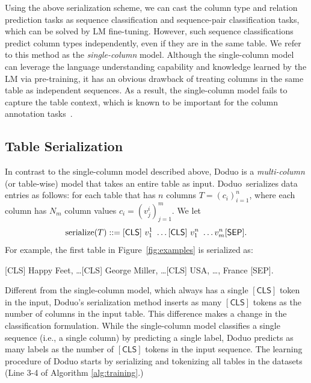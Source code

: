 \documentclass[sigconf]{acmart}
\newcommand{\name}{\mbox{\sc Doduo}}
\newcommand{\rev}[1]{#1}
\begin{document}
\vspace{-1em}
Using the above serialization scheme, we can cast the column type and relation prediction tasks as sequence classification
and sequence-pair classification tasks, which can be solved by LM fine-tuning. However, such sequence classifications predict column types independently, even if they are in the same table. 
We refer to this method as the \emph{single-column} model.
Although the single-column model can leverage the language understanding capability and knowledge learned by the LM via pre-training, 
it has an obvious drawback of treating columns in the same table as independent sequences.
As a result, the single-column model fails to capture the table context, which is known to be important for the column annotation tasks~\cite{Chen:2019:IJCAI:HNN,Zhang:2020:Sato,Khurana:2020:SemanticAnnotation4TabularData}.



\subsection{Table Serialization}
In contrast to the single-column model described above, \name{} is a {\em multi-column} (or table-wise) model that takes an entire table as input.
%
\name\ serializes data entries as follows:
for each table that has $n$ columns $T = ( c_i )_{i=1}^{n}$, where each column has $N_m$ column values $c_i = (v^i_j)_{j=1}^{m}$. We let
{
\setlength\abovedisplayskip{2pt}
\setlength\belowdisplayskip{2pt}
$$ {\rm serialize}(T) ::= \mathsf{[CLS] } \ v^1_1 \  \dots \mathsf{ [CLS] } \ v^{n}_1 \ \dots v^{n}_{m} \mathsf{ [SEP] }.$$
}
%
For example, the first table in Figure~\ref{fig:examples} is serialized as:
%
\smallskip
\noindent
\begin{small}
\begin{center}
\textsf{[CLS] Happy Feet, \dots  [CLS] George Miller, \dots [CLS] USA, \dots, France [SEP]}.
\end{center}
\end{small}

Different from the single-column model, which always has a single $\mathsf{[CLS]}$ token in the input, \name's serialization method inserts as many $\mathsf{[CLS]}$ tokens as the number of columns in the input table. 
%
This difference makes a change in the classification formulation. While the single-column model classifies a single sequence (i.e., a single column) by predicting a single label, \name{} predicts as many labels as the number of $\mathsf{[CLS]}$ tokens in the input sequence.
\rev{The learning procedure of \name{} starts 
by serializing and tokenizing all tables in the datasets (Line 3-4 of Algorithm \ref{alg:training}.)}
\end{document}
